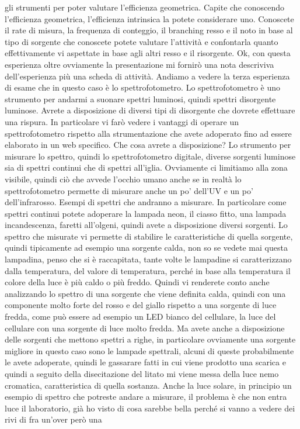 gli strumenti per poter valutare l'efficienza geometrica. Capite che conoscendo l'efficienza geometrica, l'efficienza intrinsica la potete considerare uno. Conoscete il rate di misura, la frequenza di conteggio, il branching resso e il noto in base al tipo di sorgente che conoscete potete valutare l'attività e confontarla quanto effettivamente vi aspettate in base agli altri resso e il risorgente. Ok, con questa esperienza oltre ovviamente la presentazione mi fornirò una nota descriviva dell'esperienza più una scheda di attività. Andiamo a vedere la terza esperienza di esame che in questo caso è lo spettrofotometro. Lo spettrofotometro è uno strumento per andarmi a suonare spettri luminosi, quindi spettri disorgente luminose. Avrete a disposizione di diversi tipi di disorgente che dovrete effettuare una rispura. In particolare vi farò vedere i vantaggi di operare un spettrofotometro rispetto alla strumentazione che avete adoperato fino ad essere elaborato in un web specifico. Che cosa avrete a disposizione? Lo strumento per misurare lo spettro, quindi lo spettrofotometro digitale, diverse sorgenti luminose sia di spettri continui che di spettri all'iglia. Ovviamente ci limitiamo alla zona visibile, quindi ciò che avvede l'occhio umano anche se in realtà lo spettrofotometro permette di misurare anche un po' dell'UV e un po' dell'infrarosso. Esempi di spettri che andranno a misurare. In particolare come spettri continui potete adoperare la lampada neon, il ciasso fitto, una lampada incandescenza, faretti all'olgeni, quindi avete a disposizione diversi sorgenti. Lo spettro che misurate vi permette di stabilire le caratteristiche di quella sorgente, quindi tipicamente ad esempio una sorgente calda, non so se vedete mai questa lampadina, penso che si è raccapitata, tante volte le lampadine si caratterizzano dalla temperatura, del valore di temperatura, perché in base alla temperatura il colore della luce è più caldo o più freddo. Quindi vi renderete conto anche analizzando lo spettro di una sorgente che viene definita calda, quindi con una componente molto forte del rosso e del giallo rispetto a una sorgente di luce fredda, come può essere ad esempio un LED bianco del cellulare, la luce del cellulare con una sorgente di luce molto fredda. Ma avete anche a disposizione delle sorgenti che mettono spettri a righe, in particolare ovviamente una sorgente migliore in questo caso sono le lampade spettrali, alcuni di queste probabilmente le avete adoperate, quindi le gassarare fatti in cui viene prodotto una scarica e quindi a seguito della disecitazione del litato mi viene messa della luce nemo cromatica, caratteristica di quella sostanza. Anche la luce solare, in principio un esempio di spettro che potreste andare a misurare, il problema è che non entra luce il laboratorio, già ho visto di cosa sarebbe bella perché si vanno a vedere dei rivi di fra un'over però una


